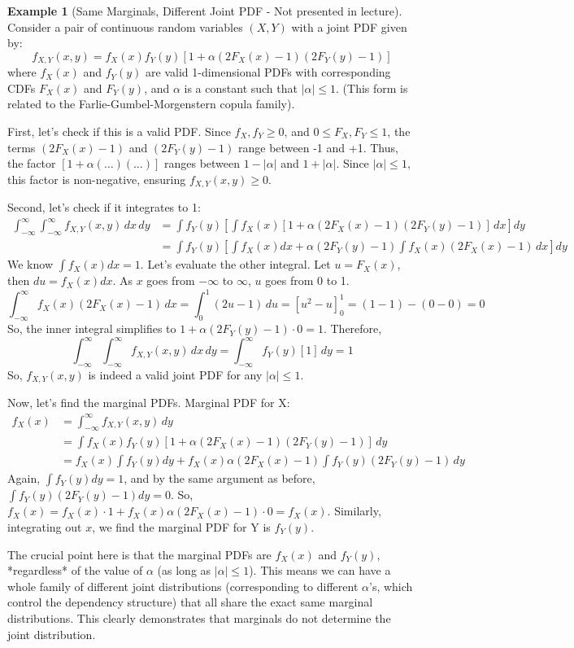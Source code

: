 \documentclass[11pt, a4paper]{article}
\theoremstyle{definition} %
\newtheorem{example}[theorem]{Example}
\begin{document}
\begin{example}[Same Marginals, Different Joint PDF - Not presented in lecture] \label{ex:fgm}
Consider a pair of continuous random variables $(X, Y)$ with a joint PDF given by:
\[ f_{X,Y}(x,y) = f_X(x) f_Y(y) [1 + \alpha (2F_X(x) - 1)(2F_Y(y) - 1)] \]
where $f_X(x)$ and $f_Y(y)$ are valid 1-dimensional PDFs with corresponding CDFs $F_X(x)$ and $F_Y(y)$, and $\alpha$ is a constant such that $|\alpha| \le 1$.
(This form is related to the Farlie-Gumbel-Morgenstern copula family).

First, let's check if this is a valid PDF. Since $f_X, f_Y \ge 0$, and $0 \le F_X, F_Y \le 1$, the terms $(2F_X(x)-1)$ and $(2F_Y(y)-1)$ range between -1 and +1. Thus, the factor $[1 + \alpha (\dots)(\dots)]$ ranges between $1-|\alpha|$ and $1+|\alpha|$. Since $|\alpha| \le 1$, this factor is non-negative, ensuring $f_{X,Y}(x,y) \ge 0$.

Second, let's check if it integrates to 1:
\begin{align*}
\int_{-\infty}^{\infty} \int_{-\infty}^{\infty} f_{X,Y}(x,y) \, dx \, dy &= \int f_Y(y) \left[ \int f_X(x) [1 + \alpha (2F_X(x) - 1)(2F_Y(y) - 1)] \, dx \right] dy \\
&= \int f_Y(y) \left[ \int f_X(x) dx + \alpha (2F_Y(y) - 1) \int f_X(x) (2F_X(x) - 1) \, dx \right] dy
\end{align*}
We know $\int f_X(x) dx = 1$. Let's evaluate the other integral. Let $u = F_X(x)$, then $du = f_X(x) dx$. As $x$ goes from $-\infty$ to $\infty$, $u$ goes from 0 to 1.
\[ \int_{-\infty}^{\infty} f_X(x) (2F_X(x) - 1) \, dx = \int_0^1 (2u - 1) \, du = [u^2 - u]_0^1 = (1-1) - (0-0) = 0 \]
So, the inner integral simplifies to $1 + \alpha (2F_Y(y) - 1) \cdot 0 = 1$.
Therefore,
\[ \int_{-\infty}^{\infty} \int_{-\infty}^{\infty} f_{X,Y}(x,y) \, dx \, dy = \int_{-\infty}^{\infty} f_Y(y) [1] \, dy = 1 \]
So, $f_{X,Y}(x,y)$ is indeed a valid joint PDF for any $|\alpha| \le 1$.

Now, let's find the marginal PDFs.
Marginal PDF for X:
\begin{align*}
f_{X}(x) &= \int_{-\infty}^{\infty} f_{X,Y}(x,y) \, dy \\
&= \int f_X(x) f_Y(y) [1 + \alpha (2F_X(x) - 1)(2F_Y(y) - 1)] \, dy \\
&= f_X(x) \int f_Y(y) dy + f_X(x) \alpha (2F_X(x) - 1) \int f_Y(y) (2F_Y(y) - 1) \, dy
\end{align*}
Again, $\int f_Y(y) dy = 1$, and by the same argument as before, $\int f_Y(y) (2F_Y(y) - 1) dy = 0$.
So, $f_X(x) = f_X(x) \cdot 1 + f_X(x) \alpha (2F_X(x) - 1) \cdot 0 = f_X(x)$.
Similarly, integrating out $x$, we find the marginal PDF for Y is $f_Y(y)$.

The crucial point here is that the marginal PDFs are $f_X(x)$ and $f_Y(y)$, *regardless* of the value of $\alpha$ (as long as $|\alpha| \le 1$). This means we can have a whole family of different joint distributions (corresponding to different $\alpha$'s, which control the dependency structure) that all share the exact same marginal distributions. This clearly demonstrates that marginals do not determine the joint distribution.
\end{example}
\end{document}
